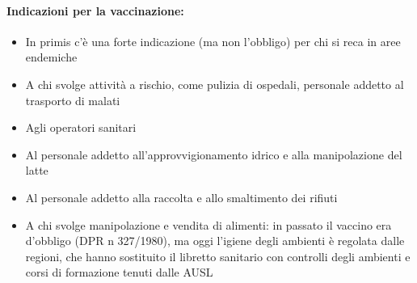 \paragraph{Indicazioni per la vaccinazione:}


\begin{itemize}
\item
  In primis c'è una forte indicazione (ma non l'obbligo) per chi si reca
  in aree endemiche
\item
  A chi svolge attività a rischio, come pulizia di ospedali, personale
  addetto al trasporto di malati
\item
  Agli operatori sanitari
\item
  Al personale addetto all'approvvigionamento idrico e alla
  manipolazione del latte
\item
  Al personale addetto alla raccolta e allo smaltimento dei rifiuti
\item
  A chi svolge manipolazione e vendita di alimenti: in passato il
  vaccino era d'obbligo (DPR n 327/1980), ma oggi l'igiene degli
  ambienti è regolata dalle regioni, che hanno sostituito il libretto
  sanitario con controlli degli ambienti e corsi di formazione tenuti
  dalle AUSL
\end{itemize}

